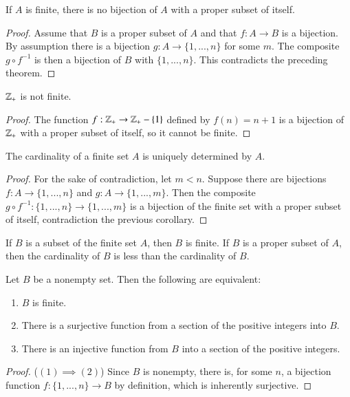 \documentclass[12pt, a4paper, oneside, openright, titlepage]{book}
\begin{document}
\begin{appendices}
    \begin{cor}
        If $A$ is finite, there is no bijection of $A$ with a proper subset of itself.
    \end{cor}
    \begin{proof}
        Assume that $B$ is a proper subset of $A$ and that $f:A\rightarrow B$ is a bijection. By assumption there is a bijection $g:A\rightarrow \{1,...,n\}$ for some $m$. The composite $g \circ f^{-1}$ is then a bijection of $B$ with $\{1,...,n\}$. This contradicts the preceding theorem.
    \end{proof}


    \begin{cor}
        $\mathbb Z_+$ is not finite.
    \end{cor}
    \begin{proof}
        The function $f:\mathbb Z_+\rightarrow \mathbb Z_+ -\{1\}$ defined by $f(n) = n+1$ is a bijection of $\mathbb Z_+$ with a proper subset of itself, so it cannot be finite.
    \end{proof}


    \begin{cor}
        The cardinality of a finite set $A$ is uniquely determined by $A$.
    \end{cor}
    \begin{proof}
        For the sake of contradiction, let $m < n$. Suppose there are bijections $f:A\rightarrow \{1,...,n\}$ and $g:A\rightarrow \{1,...,m\}$. Then the composite $g\circ f^{-1}:\{1,...,n\}\rightarrow \{1,...,m\}$ is a bijection of the finite set with a proper subset of itself, contradiction the previous corollary.
    \end{proof}


    \begin{cor}
        If $B$ is a subset of the finite set $A$, then $B$ is finite. If $B$ is a proper subset of $A$, then the cardinality of $B$ is less than the cardinality of $B$.
    \end{cor}
    

    \begin{cor}
        Let $B$ be a nonempty set. Then the following are equivalent:\begin{enumerate}
            \item $B$ is finite.
            \item There is a surjective function from a section of the positive integers into $B$.
            \item There is an injective function from $B$ into a section of the positive integers.
        \end{enumerate}
    \end{cor}
    \begin{proof}
        ($(1)\implies (2)$) Since $B$ is nonempty, there is, for some $n$, a bijection function $f:\{1,...,n\}\rightarrow B$ by definition, which is inherently surjective.


\end{proof}
\end{appendices}
\end{document}
